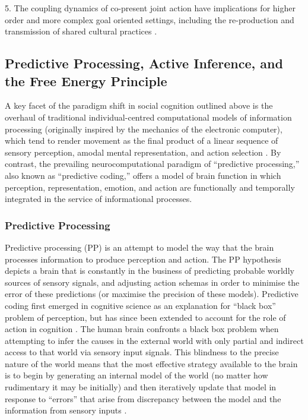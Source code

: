 5. The coupling dynamics of co-present joint action have implications for higher order and more complex goal oriented settings, including the re-production and transmission of shared cultural practices \citep{Dunbar2012,Roepstorff2010,Claidiere2014}.



\subsection{Predictive Processing, Active Inference, and the Free Energy Principle}
A key facet of the paradigm shift in social cognition outlined above is the overhaul of traditional individual-centred computational models of information processing (originally inspired by the mechanics of the electronic computer), which tend to render movement as the final product of a linear sequence of sensory perception, amodal mental representation, and action selection \citep{Lewis2005}.  By contrast, the prevailing neurocomputational paradigm of ``predictive processing,'' also known as ``predictive coding,'' \citep[see][]{Frith2007,Kilner2009,Clark2013} offers a model of brain function in which perception, representation, emotion, and action are functionally and temporally integrated in the service of informational processes.

\subsubsection{Predictive Processing}
Predictive processing (PP) is an attempt to model the way that the brain processes information to produce perception and action. The PP hypothesis depicts a brain that is constantly in the business of predicting probable worldly sources of sensory signals, and adjusting action schemas in order to minimise the error of these predictions (or maximise the precision of these models). Predictive coding first emerged in cognitive science as an explanation for ``black box'' problem of perception, but has since been extended to account for the role of action in cognition \citep{Friston2010}.
The human brain confronts a black box problem when attempting to infer the causes in the external world with only partial and indirect access to that world via sensory input signals. This blindness to the precise nature of the world means that the most effective strategy available to the brain is to begin by generating an internal model of the world (no matter how rudimentary it may be initially) and then iteratively update that model in response to ``errors'' that arise from discrepancy between the model and the information from sensory inputs \citep{Frith2007}.

